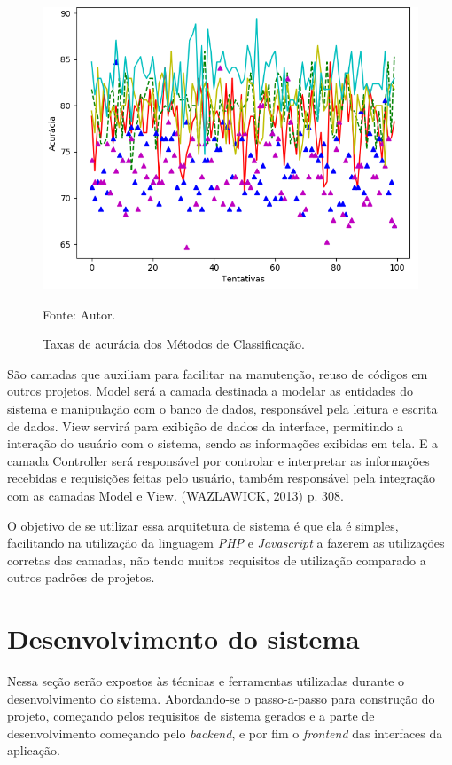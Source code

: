 \documentclass[
	12pt,				%
	openright,			%
	oneside,			%
	a4paper,			%
	english,			%
	french,				%
	spanish,			%
	brazil,				%
	]{abntex2}
\begin{document}
\begin{figure}[ht]
    \centering
    \caption{Taxas de acurácia dos Métodos de Classificação.}
    \includegraphics[width=5.0in]{Images/acc-classification.png}
    \label{fig: grafico-acc}
    
    \centering \small Fonte: Autor.
\end{figure}

São camadas que auxiliam para facilitar na manutenção, reuso de códigos em outros projetos. Model será a camada destinada a modelar as entidades do sistema e manipulação com o banco de dados, responsável pela leitura e escrita de dados. View servirá para exibição de dados da interface, permitindo a interação do usuário com o sistema, sendo as informações exibidas em tela. E a camada Controller será responsável por controlar e interpretar as informações recebidas e requisições feitas pelo usuário, também responsável pela integração com as camadas Model e View. (WAZLAWICK, 2013) p. 308.

O objetivo de se utilizar essa arquitetura de sistema é que ela é simples, facilitando na utilização da linguagem \textit{PHP} e \textit{Javascript} a fazerem as utilizações corretas das camadas, não tendo muitos requisitos de utilização comparado a outros padrões de projetos.

\section{Desenvolvimento do sistema}

Nessa seção serão expostos às técnicas e ferramentas utilizadas durante o desenvolvimento do sistema. Abordando-se o passo-a-passo para construção do projeto, começando pelos requisitos de sistema gerados e a parte de desenvolvimento começando pelo \textit{backend},  e por fim o \textit{frontend} das interfaces da aplicação. 
\end{document}

